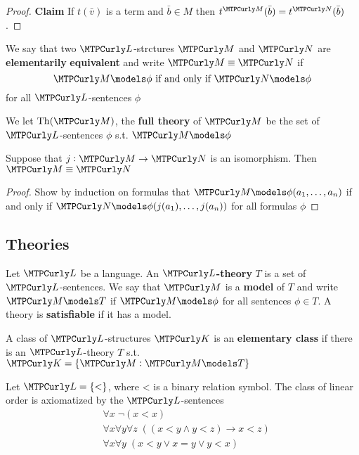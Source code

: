 \documentclass[11pt]{article}
\begin{document}
\begin{proof}
\textbf{Claim} If \(t(\bar{v})\) is a term and \(\bar{b}\in M\) then
\(t^\calm(\bar{b})=t^\caln(\bar{b})\). 
\end{proof}

\begin{definition}[]
We say that two \(\call\)-strctures \(\calm\) and \(\caln\) are \textbf{elementarily}
\textbf{equivalent} and write \(\calm\equiv\caln\) if
\begin{equation*}
 \calm\models\phi\text{ if and only if } \caln\models\phi
\end{equation*}
for all \(\call\)-sentences \(\phi\)
\end{definition}

We let \(\Th(\calm)\), the \textbf{full theory} of \(\calm\) be the set of
\(\call\)-sentences \(\phi\) s.t. \(\calm\models\phi\)

\begin{theorem}[]
\label{thm1.1.10}
Suppose that \(j:\calm\to\caln\) is an isomorphism. Then \(\calm\equiv\caln\)
\end{theorem}

\begin{proof}
Show by induction on formulas that \(\calm\models\phi(a_1,\dots,a_n)\) if and
only if \(\caln\models\phi(j(a_1),\dots,j(a_n))\) for all formulas \(\phi\)
\end{proof}
\subsection{Theories}
\label{sec:org56600c9}
Let \(\call\) be a language. An \textbf{\(\call\)-theory} \(T\) is a set of
\(\call\)-sentences. We say that \(\calm\) is a \textbf{model} of \(T\) and write
\(\calm\models T\) if \(\calm\models\phi\) for all sentences \(\phi\in T\). A
theory is \textbf{satisfiable} if it has a model.

A class of \(\call\)-structures \(\calk\) is an \textbf{elementary class} if there
is an \(\call\)-theory \(T\) s.t. \(\calk=\{\calm:\calm\models T\}\)
\begin{examplle}
Let \(\call=\{<\}\), where < is a binary relation symbol. The class of linear
order is axiomatized by the \(\call\)-sentences
\begin{align*}
&\forall x\;\neg(x<x)\\
&\forall x\forall y\forall z\;((x<y\wedge y<z)\to x<z)\\
&\forall x\forall y\;(x<y\vee x=y\vee y<x)
\end{align*}
\end{examplle}
\end{document}
